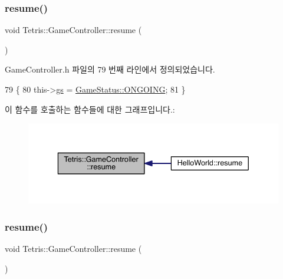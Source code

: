 \subsubsection{\texorpdfstring{resume()}{resume()}\hspace{0.1cm}{\footnotesize\ttfamily [1/2]}}
{\footnotesize\ttfamily void Tetris\+::\+Game\+Controller\+::resume (\begin{DoxyParamCaption}{ }\end{DoxyParamCaption})\hspace{0.3cm}{\ttfamily [inline]}}



Game\+Controller.\+h 파일의 79 번째 라인에서 정의되었습니다.


\begin{DoxyCode}
79                      \{
80             this->\hyperlink{class_tetris_1_1_game_controller_ae4c894005a82404c73a5a9a6efb208dc}{gs} = \hyperlink{class_tetris_1_1_game_controller_a96a963b56385f3b3a122ff0ca2beb770acff9d04a8a29792d319be9177afb8ba3}{GameStatus::ONGOING};
81         \}
\end{DoxyCode}
이 함수를 호출하는 함수들에 대한 그래프입니다.\+:
\nopagebreak
\begin{figure}[H]
\begin{center}
\leavevmode
\includegraphics[width=336pt]{db/dd2/class_tetris_1_1_game_controller_ab9ff093ea91e3d248a8a287289e758b0_icgraph}
\end{center}
\end{figure}
\mbox{\label{class_tetris_1_1_game_controller_ab9ff093ea91e3d248a8a287289e758b0}} 
\subsubsection{\texorpdfstring{resume()}{resume()}\hspace{0.1cm}{\footnotesize\ttfamily [2/2]}}
{\footnotesize\ttfamily void Tetris\+::\+Game\+Controller\+::resume (\begin{DoxyParamCaption}{ }\end{DoxyParamCaption})\hspace{0.3cm}{\ttfamily [inline]}}



